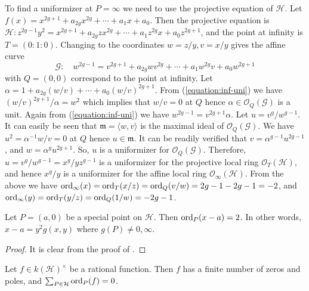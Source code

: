 To find a uniformizer at $P = \infty$ we need to use the projective equation of $\mathcal{H}$. Let 
$f(x) = x^{2g + 1} + a_{2g}x^{2g} + \cdots + a_1x+ a_0$. Then the projective equation is 
$\mathcal{H}: z^{2g - 1}y^2 = x^{2g + 1} + a_{2g}zx^{2g} + \cdots + a_1z^{2g}x+ a_0z^{2g + 1}$, and 
the point at infinity is $T = (0: 1: 0)$. Changing to the coordinates $w = z / y, v = x / y$ gives 
the affine curve
\begin{equation}
\label{equation:inf-uni}
\mathcal{G}: \quad w^{2g - 1} = v^{2g + 1} + a_{2g}wv^{2g} + \cdots + a_1w^{2g}v + a_0w^{2g + 1}
\end{equation}
with $Q = (0, 0)$ correspond to the point at infinity. Let $\alpha = 1 + a_{2g}(w / v) + \cdots + 
a_0(w / v)^{2g + 1}$. From (\ref{equation:inf-uni}) we have $(w / v)^{2g + 1} / \alpha = w^2$ which 
implies that $w / v = 0$ at $Q$ hence $\alpha \in \mathcal{O}_Q(\mathcal{G})$ is a unit. Again from 
(\ref{equation:inf-uni}) we have $w^{2g - 1} = v^{2g + 1}\alpha$. Let $u = v^g / w^{g - 1}$. It can 
easily be seen that $\mathfrak{m} = \langle w, v \rangle$ is the maximal ideal of 
$\mathcal{O}_Q(\mathcal{G})$. We have $u^2 = \alpha^{-1}w / v = 0$ at $Q$ hence $u \in 
\mathfrak{m}$. It can be readily verified that $v = \alpha^{g - 1}u^{2g - 1}$, and $w = 
\alpha^gu^{2g + 1}$. So, $u$ is a uniformizer for $\mathcal{O}_Q(\mathcal{G})$. Therefore, $u = v^g 
/ w^{g - 1} = x^g / yz^{g - 1}$ is a uniformizer for the projective local ring 
$\mathcal{O}_T(\mathcal{H})$, and hence $x^g / y$ is a uniformizer for the affine local ring 
$\mathcal{O}_\infty(\mathcal{H})$. From the above we have $\operatorname{ord}_\infty(x) = \operatorname{ord}_T(x / z) = 
\operatorname{ord}_Q(v / w) = 2g - 1 - 2g - 1 = -2$, and $\operatorname{ord}_\infty(y) = \operatorname{ord}_T(y / z) = \operatorname{ord}_Q(1 / w) = 
-2g - 1$. 
\begin{corollary}
Let $P = (a, 0)$ be a special point on $\mathcal{H}$. Then $\operatorname{ord}_P(x - a) = 2$. In other words, $x 
- a = y^2g(x, y)$ where $g(P) \ne 0, \infty$.
\end{corollary}
\begin{proof}
It is clear from the proof of .
\end{proof}
\begin{corollary}
\label{corollary:finite-zp}
Let $f \in k(\mathcal{H})^\times$ be a rational function. Then $f$ has a finite number of zeros and 
poles, and $\sum_{P \in \mathcal{H}} \operatorname{ord}_P(f) = 0$.
\end{corollary}
